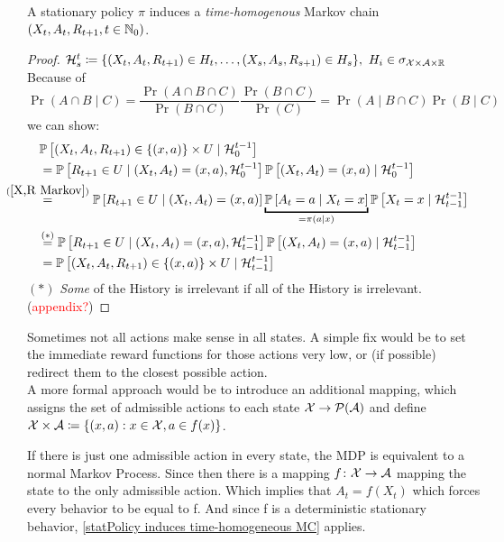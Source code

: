 \begin{remark}\label{statPolicy induces time-homogeneous MC}
	A stationary policy \(\pi\) induces a \emph{time-homogenous} Markov chain \((X_t,A_t,R_{t+1},t\in\mathbb{N}_0)\).
\end{remark}
\begin{proof} 
	\(\mathcal{H}_s^t\coloneqq \{(X_t,A_t,R_{t+1})\in H_t,\dots,(X_s,A_s,R_{s+1})\in H_s \},\ H_i \in \sigma_{\mathcal{X}\times\mathcal{A}\times\mathbb{R}}\)
	Because of
	\[
		\Pr(A\cap B \mid C)
		=\frac{\Pr(A\cap B\cap C)}{\Pr(B\cap C)}\frac{\Pr(B\cap C)}{\Pr(C)} 
		= \Pr(A\mid B\cap C)\Pr(B\mid C) 
	\]
	we can show:
	\begin{align*}
		&\Pr\left[(X_t,A_t,R_{t+1})\in\{(x,a)\}\times U \mid \cH_0^{t-1} \right] \\
		&=\Pr\left[R_{t+1}\in U \mid (X_t, A_t)=(x,a), \cH_0^{t-1}\right]
		\Pr\left[(X_t, A_t)=(x,a)\mid\cH_0^{t-1}\right]\\
		&\lxeq{(\ref{X,R Markov})}\Pr\left[R_{t+1}\in U \mid (X_t, A_t)=(x,a)\right]
		\underbracket{\Pr\left[A_t=a \mid X_t=x\right]}_{=\pi(a\mid x)}
		\Pr\left[X_t=x\mid \cH_{t-1}^{t-1}\right]\\
		&\lxeq{(*)}\Pr\left[R_{t+1}\in U \mid (X_t, A_t)=(x,a), \cH_{t-1}^{t-1}\right]
		\Pr\left[(X_t, A_t)=(x,a)\mid\cH_{t-1}^{t-1}\right]\\
		&=\Pr\left[(X_t,A_t,R_{t+1})\in\{(x,a)\}\times U \mid \cH_{t-1}^{t-1} \right]
	\end{align*}
	\((*)\) \emph{Some} of the History is irrelevant if all of the History is irrelevant. (\textcolor{red}{appendix?})
\end{proof} 
\begin{remark} Sometimes not all actions make sense in all states. A simple fix would be to set the immediate reward functions for those actions very low, or (if possible) redirect them to the closest possible action. \\
A more formal approach would be to introduce an additional mapping, which assigns the set of admissible actions to each state \(\mathcal{X}\to\mathcal{P}(\mathcal{A})\) and define \({\mathcal{X}\times\mathcal{A}}\coloneqq\{(x,a): x\in\mathcal{X}, a\in f(x) \}\).

If there is just one admissible action in every state, the MDP is equivalent to a normal Markov Process. 
Since then there is a mapping \(f\colon\mathcal{X}\to\mathcal{A}\) mapping the state to  the only admissible action. Which implies that \(A_t=f(X_t)\) which forces every behavior to be equal to f. And since f is a deterministic stationary behavior, \ref{statPolicy induces time-homogeneous MC} applies.  
\end{remark}

